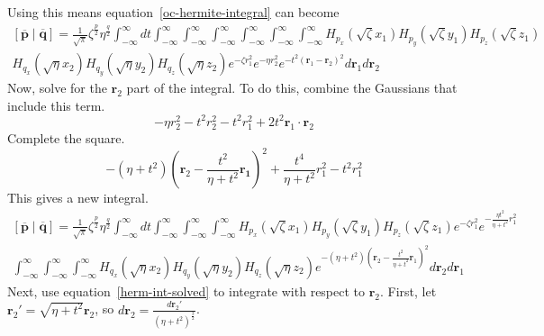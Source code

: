 Using this means equation~\ref{oc-hermite-integral} can become
\begin{multline}
  \left[\overline{\mathbf{p}}\middle|\overline{\mathbf{q}}\right] = \frac{1}{\sqrt{\pi}} \zeta^{\frac{p}{2}} \eta^{\frac{q}{2}} \int_{-\infty}^\infty dt \int_{-\infty}^\infty \int_{-\infty}^\infty \int_{-\infty}^\infty \int_{-\infty}^\infty \int_{-\infty}^\infty \int_{-\infty}^\infty H_{p_x}\left(\sqrt{\zeta} x_1\right) H_{p_y}\left(\sqrt{\zeta} y_1\right) H_{p_z}\left(\sqrt{\zeta} z_1\right) \\
  H_{q_x}\left(\sqrt{\eta}x_2\right)H_{q_y}\left(\sqrt{\eta}y_2\right)H_{q_z}\left(\sqrt{\eta}z_2\right) e^{-\zeta r_1^2}e^{-\eta r_2^2} e^{-t^2\left(\mathbf{r}_1 - \mathbf{r}_2\right)^2} d\mathbf{r}_1 d\mathbf{r}_2
\end{multline}
Now, solve for the $\mathbf{r}_2$ part of the integral. To do this, combine the Gaussians that include this term.
\begin{equation}
  -\eta r_2^2 - t^2 r_2^2 - t^2 r_1^2 + 2t^2 \mathbf{r}_1 \cdot \mathbf{r}_2
\end{equation}
Complete the square.
\begin{equation}
  -\left(\eta + t^2\right)\left(\mathbf{r}_2 - \frac{t^2}{\eta + t^2}\mathbf{r_1}\right)^2 + \frac{t^4}{\eta + t^2}r_1^2 - t^2r_1^2
\end{equation}
This gives a new integral.
\begin{multline}
  \left[\overline{\mathbf{p}}\middle|\overline{\mathbf{q}}\right] = \frac{1}{\sqrt{\pi}} \zeta^{\frac{p}{2}} \eta^{\frac{q}{2}} \int_{-\infty}^\infty dt \int_{-\infty}^\infty \int_{-\infty}^\infty \int_{-\infty}^\infty H_{p_x}\left(\sqrt{\zeta} x_1\right) H_{p_y}\left(\sqrt{\zeta} y_1\right) H_{p_z}\left(\sqrt{\zeta} z_1\right) e^{-\zeta r_1^2}e^{-\frac{\eta t^2}{\eta + t^2}r_1^2} \\
  \int_{-\infty}^\infty \int_{-\infty}^\infty \int_{-\infty}^\infty H_{q_x}\left(\sqrt{\eta}x_2\right)H_{q_y}\left(\sqrt{\eta}y_2\right)H_{q_z}\left(\sqrt{\eta}z_2\right) e^{-\left(\eta + t^2\right)\left(\mathbf{r}_2 - \frac{t^2}{\eta + t^2}\mathbf{r}_1\right)^2} d\mathbf{r}_2 d\mathbf{r}_1
\end{multline}
Next, use equation~\ref{herm-int-solved} to integrate with respect to $\mathbf{r}_2$. First, let $\mathbf{r}_2' = \sqrt{\eta + t^2}\mathbf{r}_2$, so $d\mathbf{r}_2 = \frac{d\mathbf{r}_2'}{\left(\eta + t^2\right)^{\frac{3}{2}}}$.
